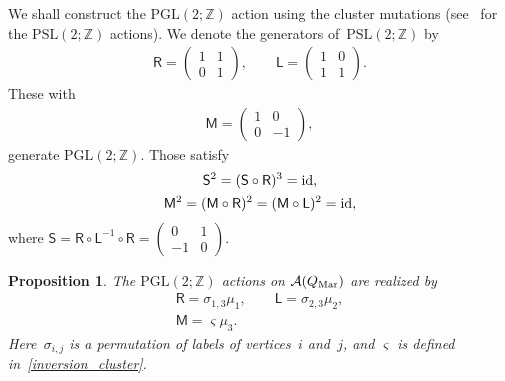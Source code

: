 \documentclass[pdftex]{sigma}
\numberwithin{equation}{section}
\newtheorem{Proposition}[Theorem]{Proposition}
 { \theoremstyle{definition}
\newtheorem{Definition}[Theorem]{Definition}
\newtheorem{Note}[Theorem]{Note}
\newtheorem{Example}[Theorem]{Example}
\newtheorem{Remark}[Theorem]{Remark} }
\begin{document}
We shall construct the $\mathrm{PGL}(2;\mathbb{Z})$ action using the cluster mutations (see~\cite{HikamiRInoue12a,NagaTeraYama11a} for the $\mathrm{PSL}(2;\mathbb{Z})$ actions). We denote the generators of~$\mathrm{PSL}(2;\mathbb{Z})$ by
\begin{gather*} %
 \mathsf{R}= \begin{pmatrix}
 1 & 1 \\
 0 & 1
 \end{pmatrix},
 \qquad
 \mathsf{L} = \begin{pmatrix}
 1 & 0 \\
 1 & 1
 \end{pmatrix} .
\end{gather*}
These with
\begin{gather*} %
 \mathsf{M}=
 \begin{pmatrix}
 1 & 0 \\
 0 & -1
 \end{pmatrix} ,
\end{gather*}
generate $\mathrm{PGL}(2;\mathbb{Z})$. Those satisfy
\begin{gather} \label{def_PSL}
 \mathsf{S}^2= (\mathsf{S} \circ \mathsf{R})^3 = {\rm id}, \\
 \label{def_PGL}
 \mathsf{M}^2 = ( \mathsf{M} \circ \mathsf{R} )^2 = ( \mathsf{M} \circ \mathsf{L} )^2 = {\rm id},
\end{gather}
where $\mathsf{S}=\mathsf{R} \circ \mathsf{L}^{-1} \circ \mathsf{R}=\left( \begin{smallmatrix} 0 & 1 \\ -1 & 0 \end{smallmatrix}\right)$.

\begin{Proposition} The $\mathrm{PGL}(2;\mathbb{Z})$ actions on $\mathcal{A}(Q_{\text{\rm Mar}})$ are realized by
 \begin{gather} \label{RL_torus}
 \mathsf{R} = \sigma_{1,3} \mu_1, \qquad \mathsf{L} = \sigma_{2,3} \mu_2 , \\
 \mathsf{M}= \varsigma \mu_3 .\nonumber
 \end{gather}
 Here~$\sigma_{i,j}$ is a permutation of labels of vertices~$i$ and~$j$, and $\varsigma$ is defined in~\eqref{inversion_cluster}.
\end{Proposition}
\end{document}
